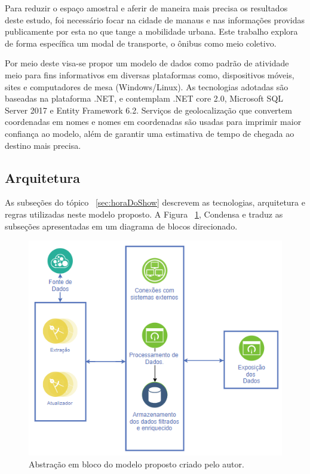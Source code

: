 \documentclass[12pt]{article}
\begin{document}
Para reduzir o espaço amostral e aferir de maneira mais precisa os resultados deste estudo, foi necessário focar na cidade de manaus e nas informações providas publicamente por esta no que tange a mobilidade urbana. Este trabalho explora de forma  específica um modal de transporte, o ônibus como meio coletivo.

Por meio deste visa-se propor um modelo de dados como padrão de atividade meio para fins informativos em diversas plataformas como, dispositivos móveis, sites e computadores de mesa (Windows/Linux). As tecnologias adotadas são baseadas na plataforma .NET, e contemplam .NET core 2.0, Microsoft SQL Server 2017 e Entity Framework 6.2. Serviços de geolocalização que convertem coordenadas em nomes e nomes em coordenadas são usadas para imprimir maior confiança ao modelo, além de garantir uma estimativa de tempo de chegada ao destino mais precisa.

\subsection{Arquitetura}\label{sec:Arquitetura}
As subseções do tópico ~\ref{sec:horaDoShow} descrevem as tecnologias, arquitetura e regras utilizadas neste modelo proposto. A Figura ~\ref{fig:Arquiteura}, Condensa e traduz as subseções apresentadas em um diagrama de blocos direcionado.

\begin{figure}[ht]
\centering
\includegraphics[width=.75\textwidth]{./Resources/arquitetura.PNG}
\caption{Abstração em bloco do modelo proposto criado pelo autor.}
\label{fig:Arquiteura}
\end{figure}
\end{document}
